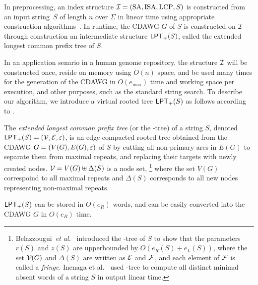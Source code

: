 \documentclass{article}
\begin{document}
In preprocessing, an index structure $\mathcal{I} = (\mathrm{SA}, \mathrm{ISA}, \mathrm{LCP}, S)$ is constructed from an input string~$S$ of length $n$ over $\Sigma$ in linear time using appropriate construction algorithms~\cite{navarro2016cds:book,navarro2021indexing:ii}.
In runtime, the CDAWG $G$ of $S$ is constructed on $\mathcal{I}$ through construction an intermediate structure $\mathsf{LPT}_{+}(S)$, called the extended longest common prefix tree of $S$.

In an application senario in a human genome repository, the structure $\mathcal{I}$ will be constructed once, reside on memory using $O(n)$ space, and be used many times for the generation of the CDAWG in $O(e_{\max})$ time and working space per execution, and other purposes, such as the standard string search.
To describe our algorithm, we introduce a virtual rooted tree $\mathsf{LPT}_{+}(S)$ as follows according to \cite{belazzougui:nunial:gagie:prezza:raffinot2015composite,inenaga2024computing}. 

\begin{definition}[informal]\rm 
The \textit{extended longest common prefix tree} (or the \LPTrm-tree) of a string $S$, denoted $\mathsf{LPT}_{+}(S) = (\mathcal{V}, \mathcal{E}, \varepsilon)$, is an edge-compacted rooted tree obtained from the CDAWG $G = (V(G), E(G), \varepsilon)$ of $S$ by cutting all non-primary arcs in $E(G)$ to separate them from maximal repeats, and replacing their targets with newly created nodes.
$\mathcal{V} = V(G)\uplus\Delta(S)$ is a node set,%
\footnote{Belazzougui~\textit{et al.}~\cite{belazzougui:nunial:gagie:prezza:raffinot2015composite} introduced the \LPTrm-tree of $S$ to show that the parameters $r(S)$ and $z(S)$ are upperbounded by $O(e_R(S) + e_L(S))$, where the set $\mathcal{V}_{}(G)$ and $\Delta(S)$ are written as $\mathcal{E}$ and $\mathcal{F}$, and each element of $\mathcal{F}$ is called a \textit{fringe}. Inenaga et al.~\cite{inenaga2024computing} used \LPTrm-tree to compute all distinct minimal absent words of a string $S$ in output linear time. 
}
where the set $V(G)$ correspoind to all maximal repeats and $\Delta(S)$ corresponds to all new nodes representing non-maximal repeats.
\end{definition}

  $\mathsf{LPT}_{+}(S)$ can be stored in $O(e_R)$ words, and can be easily converted into the CDAWG $G$ in $O(e_R)$ time.
\end{document}
